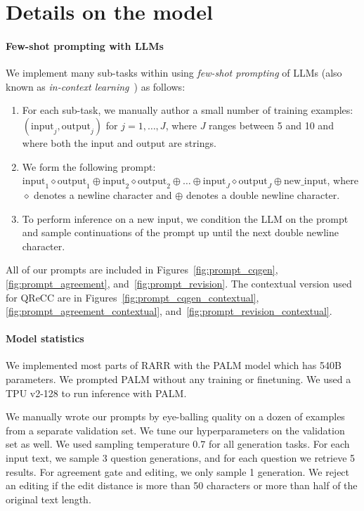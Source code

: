 \documentclass[11pt]{article}
\begin{document}


\section{Details on the model}
\label{app:model-details}

\paragraph{Few-shot prompting with LLMs} \label{section:prompting}

We implement many sub-tasks within \approach{} using \emph{few-shot prompting} of LLMs (also known as \emph{in-context learning}~\cite{Brown2020LanguageMA}) as follows:
\begin{enumerate} \setcounter{enumi}{0}
\item
For each sub-task, we manually author a small number of training examples: \texttt{$(\text{input}_j, \text{output}_j)$} for $j=1,\ldots,J$, where $J$ ranges between 5 and 10 and where both the input and output are strings.
\item
We form the following prompt: \texttt{$\text{input}_1 \diamond \text{output}_1 \oplus \text{input}_2 \diamond \text{output}_2 \oplus \ldots \oplus \text{input}_J \diamond \text{output}_J \oplus \text{new\_input}$}, where $\diamond$ denotes a newline character and $\oplus$ denotes a double newline character.
\item
To perform inference on a new input, we condition the LLM on the prompt and sample continuations of the prompt up until the next double newline character.
\end{enumerate}
All of our prompts are included in Figures~\ref{fig:prompt_cqgen}, \ref{fig:prompt_agreement}, and~\ref{fig:prompt_revision}. The contextual version used for QReCC are in Figures~\ref{fig:prompt_cqgen_contextual}, \ref{fig:prompt_agreement_contextual}, and~\ref{fig:prompt_revision_contextual}.


\paragraph{Model statistics}


We implemented most parts of RARR with the PALM model which has 540B parameters. We prompted PALM without any training or finetuning. We used a TPU  v2-128 to run inference with PALM.

We manually wrote our prompts by eye-balling quality on a dozen of examples from a separate validation set.
We tune our hyperparameters on the validation set as well. We used sampling temperature 0.7 for all generation tasks. For each input text, we sample 3 question generations, and for each question we retrieve 5 results. For agreement gate and editing, we only sample 1 generation. We reject an editing if the edit distance is more than 50 characters or more than half of the original text length.
\end{document}
